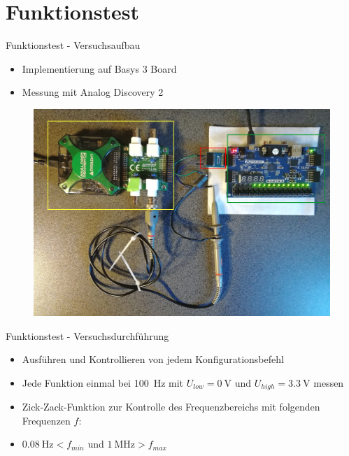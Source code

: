 \documentclass[11pt]{beamer}
\begin{document}
\section{Funktionstest}

\begin{frame}{Funktionstest - Versuchsaufbau}
  \begin{itemize}
    \item Implementierung auf Basys 3 Board
    \item Messung mit Analog Discovery 2
  \end{itemize}
  \begin{figure}
    \includegraphics[scale=0.15]{testaufbau_annotated_fg}
  \end{figure}
\end{frame}

\begin{frame}{Funktionstest - Versuchsdurchführung}
  \begin{itemize}
  \item Ausführen und Kontrollieren von jedem Konfigurationsbefehl
  \item Jede Funktion einmal bei \SI{100}{\hertz} mit $U_{low} = \SI{0}{\volt}$ und $U_{high} = \SI{3.3}{\volt}$ messen
  \item Zick-Zack-Funktion zur Kontrolle des Frequenzbereichs mit folgenden Frequenzen $f$:
    \begin{table}
    \end{table}
  \item $\SI{0.08}{\hertz} < f_{min}$ und $\SI{1}{\mega\hertz} > f_{max}$
  \end{itemize}

\end{frame}
\end{document}
